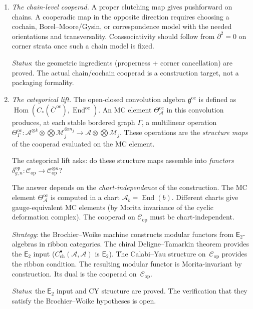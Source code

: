 \documentclass[11pt]{article}
\newcommand{\cA}{\mathcal{A}}
\newcommand{\cC}{\mathcal{C}}
\newcommand{\cM}{\mathcal{M}}
\newcommand{\Etwo}{\mathsf{E}_2}
\newcommand{\End}{\operatorname{End}}
\newcommand{\Hom}{\operatorname{Hom}}
\begin{document}
\begin{remark}
\begin{enumerate}[label=\textup{(P\arabic*$'$)},nosep]
\item \emph{The chain-level cooperad.}
  A proper clutching map gives pushforward on chains.  A
  cooperadic map in the opposite direction requires choosing a
  cochain, Borel--Moore/Gysin, or correspondence model with the
  needed orientations and transversality.  Coassociativity should
  follow from $\partial^2=0$ on corner strata once such a chain
  model is fixed.

  \emph{Status}: the geometric ingredients (properness + corner
  cancellation) are proved.  The actual chain/cochain cooperad is
  a construction target, not a packaging formality.

\item \emph{The categorical lift.}
  The open-closed convolution algebra
  $\mathfrak{g}^{\mathrm{oc}}$ is defined as
  $\Hom(C_*(\overline{C}^{\,\mathrm{oc}}),
  \End^{\mathrm{oc}})$.
  An MC element $\Theta^{\mathrm{oc}}_\cA$ in this
  convolution produces, at each stable bordered graph
  $\Gamma$, a multilinear operation
  $\Theta^{\mathrm{oc}}_\Gamma \colon
  \cA^{\otimes k} \otimes \bigotimes \cM_j^{\otimes m_j}
  \to \cA \otimes \bigotimes \cM_j$.
  These operations are the \emph{structure maps} of the
  cooperad evaluated on the MC element.

  The categorical lift asks: do these structure maps
  assemble into \emph{functors}
  $\delta_{g,n}^{\mathrm{op}} \colon
  \cC_{\mathrm{op}} \to \cC_{\mathrm{op}}^{\otimes n}$?

  The answer depends on the \emph{chart-independence}
  of the construction.  The MC element
  $\Theta^{\mathrm{oc}}_\cA$ is computed in a chart
  $\cA_b = \End(b)$.  Different charts give
  gauge-equivalent MC elements (by Morita invariance of
  the cyclic deformation complex).  The cooperad on
  $\cC_{\mathrm{op}}$ must be chart-independent.

  \emph{Strategy}: the Brochier--Woike machine
  \cite{BrochierWoike2022} constructs modular functors
  from $\Etwo$-algebras in ribbon categories.  The chiral
  Deligne--Tamarkin theorem provides the $\Etwo$ input
  ($C^\bullet_{\mathrm{ch}}(\cA,\cA)$ is $\Etwo$).
  The Calabi--Yau structure on~$\cC_{\mathrm{op}}$
  provides the ribbon condition.  The resulting modular
  functor is Morita-invariant by construction.  Its dual
  is the cooperad on~$\cC_{\mathrm{op}}$.

  \emph{Status}: the $\Etwo$ input and CY structure are
  proved.  The verification that they satisfy the
  Brochier--Woike hypotheses is open.


\end{enumerate}
\end{remark}
\end{document}
